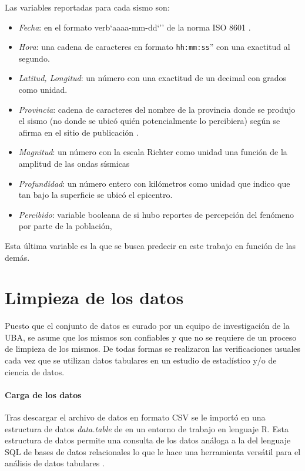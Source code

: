 \documentclass[a4paper]{report}
\begin{document}
Las variables reportadas para cada sismo son:
\begin{itemize}
	\item \emph{Fecha}: en el formato verb`aaaa-mm-dd`'' de la norma ISO 8601 \cite{noauthor_iso_2019}.
	\item \emph{Hora}: una cadena de caracteres en formato \verb`hh:mm:ss`'' con una exactitud al segundo.
	\item \emph{Latitud, Longitud}: un número con una exactitud de un decimal con grados como unidad.
	\item \emph{Provincia}: cadena de caracteres del nombre de la provincia donde se produjo el sismo (no donde se ubicó quién potencialmente lo percibiera) según se afirma en el sitio de publicación \cite[5.1.1]{daniela_parada_ic-datasets-docencia_nodate}.
	\item \emph{Magnitud}: un número con la escala Richter como unidad una función de la amplitud de las ondas sísmicas \cite[sección 4.2.3]{fowler_solid_1990}
	\item \emph{Profundidad}: un número entero con kilómetros como unidad que indico que tan bajo la superficie se ubicó el epicentro.
	\item \emph{Percibido}: variable booleana de si hubo reportes de percepción del fenómeno por parte de la población, 
\end{itemize}
Esta última variable es la que se busca predecir en este trabajo en función de las demás. 



\section{Limpieza de los datos}

Puesto que el conjunto de datos es curado por un equipo de investigación de la UBA, se asume que los mismos son confiables y que no se requiere de un proceso de limpieza de los mismos.
De todas formas se realizaron las verificaciones usuales cada vez que se utilizan datos tabulares en un estudio de estadístico y/o de ciencia de datos.

\paragraph{Carga de los datos}
Tras descargar el archivo de datos en formato CSV se le importó en una estructura de datos \emph{data.table} de en un entorno de trabajo en lenguaje R.
Esta estructura de datos permite una consulta de los datos análoga a la del lenguaje SQL de bases de datos relacionales lo que le hace una herramienta versátil para el análisis de datos tabulares \cite{noauthor_introduction_2024}.
\end{document}
